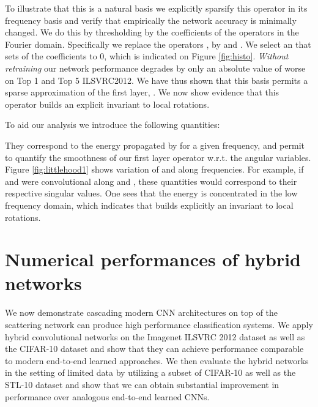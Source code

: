 \documentclass[10pt,twocolumn,letterpaper]{article}
\begin{document}
To illustrate that this is a natural basis we explicitly sparsify this operator in its frequency basis and verify that empirically the network accuracy is minimally changed. We do this by thresholding  by  the coefficients of the operators in the Fourier domain. Specifically we replace the operators ,  by  and . We select an  that sets  of the coefficients to 0, which is indicated on Figure \ref{fig:histo}. \textit{Without retraining} our network performance degrades by only an absolute value of  worse on Top 1 and Top 5 ILSVRC2012. We have thus shown that this basis permits a sparse approximation of the first layer, . We now show evidence that this operator builds an explicit invariant to local rotations.

To aid our analysis we introduce the following quantities:
\setlength{\belowdisplayskip}{0pt} \setlength{\belowdisplayshortskip}{0pt}
\setlength{\abovedisplayskip}{0pt} \setlength{\abovedisplayshortskip}{0pt}



They correspond to the energy propagated by  for a given frequency, and permit to quantify the smoothness of our first layer operator w.r.t. the angular variables. Figure \ref{fig:littlehood1} shows variation of   and  along frequencies. For example, if  and  were convolutional along  and , these quantities would correspond to their respective singular values. One sees that the energy is concentrated in the low frequency domain, which indicates that  builds explicitly an invariant to local rotations.








 
\section{Numerical performances of hybrid networks}
\label{small2}
We now demonstrate cascading modern CNN architectures on top of the scattering network can produce high performance classification systems. We apply hybrid convolutional networks on the Imagenet ILSVRC 2012 dataset as well as the CIFAR-10 dataset and show that they can achieve performance comparable to modern end-to-end learned approaches. We then evaluate the hybrid networks in the setting of limited data by utilizing a subset of CIFAR-10 as well as the STL-10 dataset and show that we can obtain substantial improvement in performance over analogous end-to-end learned CNNs. 
\end{document}
